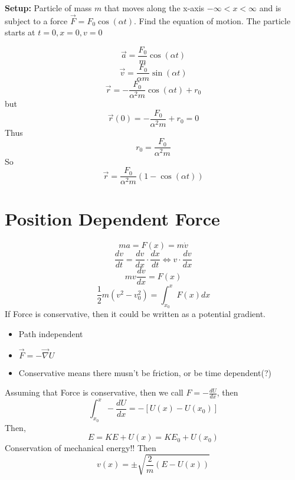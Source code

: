 \documentclass{article}
\newtheorem{one minute paper}[theorem]{One Minute Paper}
\begin{document}
\textbf{Setup: } Particle of mass $m$ that moves along the x-axis $-\infty < x < \infty$ and is subject to a force $\vec{F} = F_0\cos(\alpha t)$. Find the equation of motion. The particle starts at $t = 0, x = 0, v = 0$

\begin{equation}
    \vec{a} = \frac{F_0}{m}\cos(\alpha t)
\end{equation}
\begin{equation}
    \vec{v} = \frac{F_0}{\alpha m}\sin(\alpha t)
\end{equation}
\begin{equation}
    \vec{r} = -\frac{F_0}{\alpha^2 m}\cos(\alpha t) + r_0
\end{equation}
but 
\begin{equation}
    \vec{r}(0) = -\frac{F_0}{\alpha^2 m} + r_0 = 0
\end{equation}
Thus
\begin{equation}
    r_0 = \frac{F_0}{\alpha^2 m}
\end{equation}
So 
\begin{equation}
    \vec{r} = \frac{F_0}{\alpha^2 m}(1-\cos(\alpha t))
\end{equation}

\section*{Position Dependent Force}
\begin{equation}
    ma = F(x) = m\dot{v}
\end{equation}
\begin{equation}
    \frac{dv}{dt} = \frac{dv}{dx} \cdot \frac{dx}{dt} \iff v \cdot \frac{dv}{dx}
\end{equation}
\begin{equation}
    mv\frac{dv}{dx} = F(x)
\end{equation}
\begin{equation}
    \frac{1}{2}m(v^2 - v_0^2) = \int_{x_0}^{x}F(x)dx
\end{equation}
If Force is conservative, then it could be written as a potential gradient.
\begin{itemize}
    \item Path independent
    \item $\vec{F} = -\vec{\nabla} U$
    \item Conservative means there musn't be friction, or be time dependent(?)
\end{itemize}

Assuming that Force is conservative, then we call $F = -\frac{dU}{dx}$, then 
\begin{equation}
    \int_{x_0}^{x}-\frac{dU}{dx} = -[U(x) - U(x_0)]
\end{equation}
Then,
\begin{equation}
    E = KE + U(x) = KE_0 + U(x_0)
\end{equation}
Conservation of mechanical energy!!
Then
\begin{equation}
    v(x) = \pm \sqrt{\frac{2}{m}(E - U(x))}
\end{equation}
\end{document}
